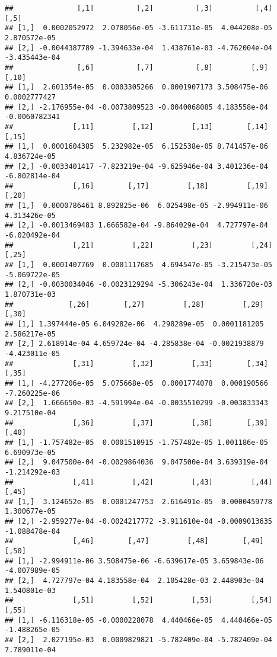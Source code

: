 \documentclass[
]{article}
\begin{document}
\begin{verbatim}
##               [,1]          [,2]          [,3]          [,4]          [,5]
## [1,]  0.0002052972  2.078056e-05 -3.611731e-05  4.044208e-05  2.870572e-05
## [2,] -0.0044387789 -1.394633e-04  1.438761e-03 -4.762004e-04 -3.435443e-04
##               [,6]          [,7]          [,8]         [,9]         [,10]
## [1,]  2.601354e-05  0.0003305266  0.0001907173 3.508475e-06  0.0002777427
## [2,] -2.176955e-04 -0.0073809523 -0.0040068085 4.183558e-04 -0.0060782341
##              [,11]         [,12]         [,13]        [,14]         [,15]
## [1,]  0.0001604385  5.232982e-05  6.152538e-05 8.741457e-06  4.836724e-05
## [2,] -0.0033401417 -7.823219e-04 -9.625946e-04 3.401236e-04 -6.802814e-04
##              [,16]        [,17]         [,18]         [,19]         [,20]
## [1,]  0.0000786461 8.892825e-06  6.025498e-05 -2.994911e-06  4.313426e-05
## [2,] -0.0013469483 1.666582e-04 -9.864029e-04  4.727797e-04 -6.020492e-04
##              [,21]         [,22]         [,23]         [,24]         [,25]
## [1,]  0.0001407769  0.0001117685  4.694547e-05 -3.215473e-05 -5.069722e-05
## [2,] -0.0030034046 -0.0023129294 -5.306243e-04  1.336720e-03  1.870731e-03
##             [,26]        [,27]         [,28]         [,29]         [,30]
## [1,] 1.397444e-05 6.049282e-06  4.298289e-05  0.0001181205  2.586217e-05
## [2,] 2.618914e-04 4.659724e-04 -4.285838e-04 -0.0021938879 -4.423011e-05
##              [,31]         [,32]         [,33]        [,34]         [,35]
## [1,] -4.277206e-05  5.075668e-05  0.0001774078  0.000190566 -7.260225e-06
## [2,]  1.666650e-03 -4.591994e-04 -0.0035510299 -0.003833343  9.217510e-04
##              [,36]         [,37]         [,38]        [,39]         [,40]
## [1,] -1.757482e-05  0.0001510915 -1.757482e-05 1.001186e-05  6.690973e-05
## [2,]  9.047500e-04 -0.0029864036  9.047500e-04 3.639319e-04 -1.214292e-03
##              [,41]         [,42]         [,43]         [,44]         [,45]
## [1,]  3.124652e-05  0.0001247753  2.616491e-05  0.0000459778  1.300677e-05
## [2,] -2.959277e-04 -0.0024217772 -3.911610e-04 -0.0009013635 -1.088478e-04
##              [,46]        [,47]         [,48]        [,49]         [,50]
## [1,] -2.994911e-06 3.508475e-06 -6.639617e-05 3.659843e-06 -4.007989e-05
## [2,]  4.727797e-04 4.183558e-04  2.105428e-03 2.448903e-04  1.540801e-03
##              [,51]         [,52]         [,53]         [,54]         [,55]
## [1,] -6.116318e-05 -0.0000228078  4.440466e-05  4.440466e-05 -1.488265e-05
## [2,]  2.027195e-03  0.0009829821 -5.782409e-04 -5.782409e-04  7.789011e-04

\end{verbatim}
\end{document}
